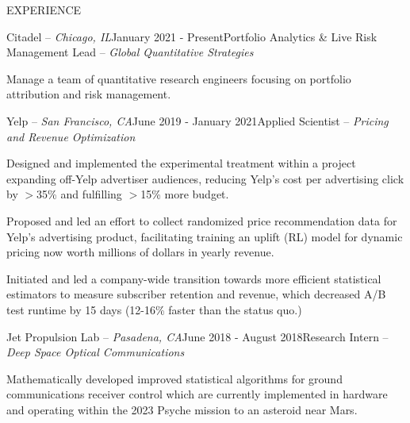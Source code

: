 \documentclass{resume} %
\begin{document}
 

\vspace{-1em}
\begin{rSection}{EXPERIENCE}

	\begin{rSubsection}{Citadel -- {\it Chicago, IL}}{January 2021 - Present}{Portfolio Analytics \& Live Risk Management Lead -- {\sl Global Quantitative Strategies}}

\item Manage a team of quantitative research engineers focusing on portfolio attribution and risk management.

\end{rSubsection}

\begin{rSubsection}{Yelp -- {\it San Francisco, CA}}{June 2019 - January 2021}{Applied Scientist -- {\sl Pricing and Revenue Optimization}}

\item Designed and implemented the experimental treatment within a project expanding off-Yelp advertiser audiences, reducing Yelp's cost per advertising click by $>$35\% and fulfilling $>$15\% more budget.

\item Proposed and led an effort to collect randomized price recommendation data for Yelp's advertising product, facilitating training an uplift (RL) model for dynamic pricing now worth millions of dollars in yearly revenue.

\item Initiated and led a company-wide transition towards more efficient statistical estimators to measure subscriber retention and revenue, which decreased A/B test runtime by 15 days (12-16\% faster than the status quo.)

\end{rSubsection}

\begin{rSubsection}{Jet Propulsion Lab -- {\it Pasadena, CA}}{June 2018 - August 2018}{Research Intern -- {\sl Deep Space Optical Communications}}

\item Mathematically developed improved statistical algorithms for ground communications receiver control which are currently implemented in hardware and operating within the 2023 Psyche mission to an asteroid near Mars.
\end{rSubsection}


\end{rSection}
\end{document}
